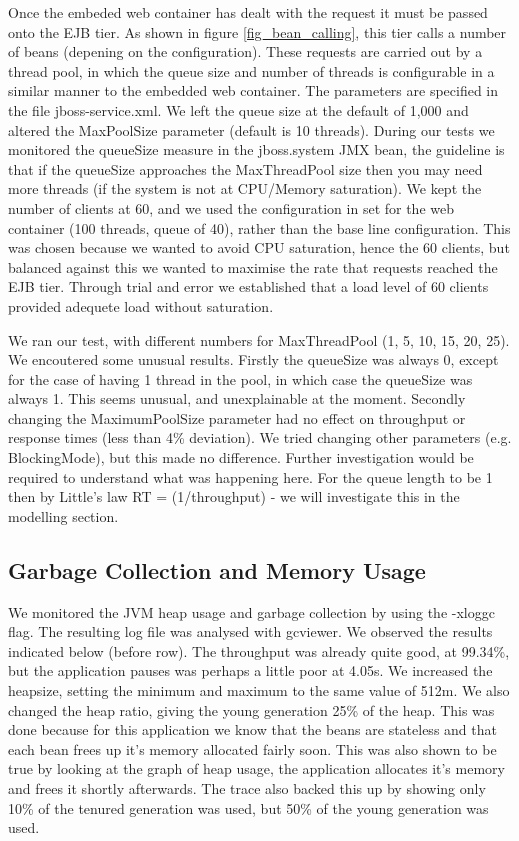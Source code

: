 Once the embeded web container has dealt with the request it must be passed onto the EJB tier. As shown in figure \ref{fig_bean_calling}, this tier calls a number of beans (depening on the configuration). These requests are carried out by a thread pool, in which the queue size and number of threads is configurable in a similar manner to the embedded web container. The parameters are specified in the file jboss-service.xml. We left the queue size at the default of 1,000 and altered the MaxPoolSize parameter (default is 10 threads). During our tests we monitored the queueSize measure in the jboss.system JMX bean, the guideline\cite{master_the_boss} is that if the queueSize approaches the MaxThreadPool size then you may need more threads (if the system is not at CPU/Memory saturation). We kept the number of clients at 60, and we used the configuration in set for the web container (100 threads, queue of 40), rather than the base line configuration. This was chosen because we wanted to avoid CPU saturation, hence the 60 clients, but balanced against this we wanted to maximise the rate that requests reached the EJB tier. Through trial and error we established that a load level of 60 clients provided adequete load without saturation.

We ran our test, with different numbers for MaxThreadPool (1, 5, 10, 15, 20, 25). We encoutered some unusual results. Firstly the queueSize was always 0, except for the case of having 1 thread in the pool, in which case the queueSize was always 1. This seems unusual, and unexplainable at the moment. Secondly changing the MaximumPoolSize parameter had no effect on throughput or response times (less than 4\% deviation). We tried changing other parameters (e.g. BlockingMode), but this made no difference. Further investigation would be required to understand what was happening here. For the queue length to be 1 then by Little's law RT = (1/throughput) - we will investigate this in the modelling section.

\subsection*{Garbage Collection and Memory Usage}

We monitored the JVM heap usage and garbage collection by using the -xloggc flag. The resulting log file was analysed with gcviewer. We observed the results indicated below (before row). The throughput was already quite good, at 99.34\%, but the application pauses was perhaps a little poor at 4.05s. We increased the heapsize, setting the minimum and maximum to the same value of 512m. We also changed the heap ratio, giving the young generation 25\% of the heap. This was done because for this application we know that the beans are stateless and that each bean frees up it's memory allocated fairly soon. This was also shown to be true by looking at the graph of heap usage, the application allocates it's memory and frees it shortly afterwards. The trace also backed this up by showing only 10\% of the tenured generation was used, but 50\% of the young generation was used.

